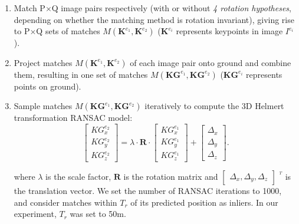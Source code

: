 \begin{enumerate}
    \item Match P$\times$Q image pairs respectively (with or without \textit{4 rotation hypotheses}, depending on whether the matching method is rotation invariant), giving rise to P$\times$Q sets of matches $M({\mathbf{K}^{e_1},\mathbf{K}^{e_2}})$ ($\mathbf{K}^{e_i}$ represents keypoints in image $I^{e_i}$).
    \item Project matches $M({\mathbf{K}^{e_1},\mathbf{K}^{e_2}})$ of each image pair onto ground and combine them, resulting in one set of matches $M({\mathbf{KG}^{e_1},\mathbf{KG}^{e_2}})$ ($\mathbf{KG}^{e_i}$ represents points on ground).
    \item Sample matches $M({\mathbf{KG}^{e_1},\mathbf{KG}^{e_2}})$ iteratively to compute the 3D Helmert transformation RANSAC model:
\begin{equation}
\left [ \begin{array}{c}
{KG}_x^{e_2}\\
{KG}_y^{e_2}\\
{KG}_z^{e_2}
\end{array}
\right ] =\lambda \cdot \mathbf{R} \cdot {\left [ \begin{array}{c}
    {KG}_x^{e_1}\\
    {KG}_y^{e_1}\\
    {KG}_z^{e_1}
    \end{array}
    \right ]} + \left [ \begin{array}{c}
\Delta_x\\
\Delta_y\\
\Delta_z
\end{array}
\right ]. \label{eq:2DSim}
\end{equation}
    
where $\lambda$ is the scale factor, $\mathbf{R}$ is the rotation matrix and $\left [ \begin{array}{c}
    \Delta_x, \Delta_y, \Delta_z
\end{array}
\right ]$ $^{^T}$ is the translation vector.
We set the number of RANSAC iterations to 1000, and consider matches within $T_r$ of its predicted position as inliers. In our experiment, {$T_r$ was set to 50m.}
\end{enumerate}


